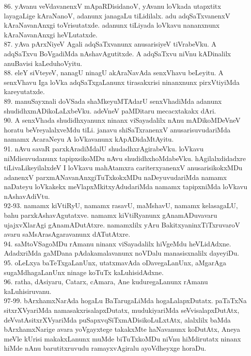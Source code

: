 \documentclass{article}
\begin{document}
86. yAvanu veVdavanenxV mApaRDisidanoV, yAvanu loVkada utapxtitx layagaLige kAraNanoV, adanunx janagaLu tiLidilalx. adu adqSaTxvanenxV kAraNavanAnxgi toVrisutatxde. adanunx tiLiyada loVkavu nananxnunx kAraNavanAnxgi heVLutatxde.\\
87. yAva pArxNiyeV Agali adqSaTxvanunx anusarisiyeV tiVrabeVku. A adqSaTxvu BoVgadiMda nAshavAgutitxde. A adqSaTxvu niVnu kADinalilx anuBavisi kaLeduhoVyitu.\\
88. eleY siVteyeV, nanagU ninagU akAraNavAda senxVhavu beLeyitu. A senxVhavu Iga loVka adqSaTxgaLanunx tirasakxrisi ninanxnunx pirxVtiyiMda kareyutatxde.\\
89. manuSayxnali doVSada shaMkeyuMTAdarU senxVhadiMda adanunx shudidhxmADikoLaLxbeVku. adeVneV paMDitaru mecacxtakakx dAri.\\
90. A senxVhada shudidhxyanunx ninanx viSayadalilx nAnu mADikoMDeVneV horatu beVreyalalxveMdu tiLi. janavu shiSaTxranenxV anusarisuvudariMda namamx AcaraNeyu A loVkavanunx kApADidaMtAyitu.\\
91. nAvu savaR parxkAradiMdalU shudadhxrAgirabeVku. loVkavu niMdisuvudanunx tapipxsikoMDu nAvu shudidhxhoMdabeVku. hAgilalxdidadxre tiLivaLikeyilalxdeV I loVkavu mahAtamxra cariterxyanenxV anusarisikokxMDu adanenxV parxmANavanAnxgiTuTxkokxMDu naDeyuvudariMda namamx naDateyu loVkakekx meVlapxMkitxyAdudariMda namamx tapipxniMda loVkavu nAshavAdiVtu.\\
92-93. namamx kiVtiRyU, namamx rasavU, maMshavU, namamx kelasagaLU, bahu parxkAshavAgutatxve. namamx kiVtiRyanunx gAnamADuvavaru ujajxvXlarAgi gAnamADutAtxre. namamxlilx yAru BakitxyaninxTiTxruvaroV avaru saMsArasAgaravanunx dATutAtxre.\\
94. saMtoVSagoMDu rAmanu ninanx viSayadalilx hiVgeMdu heVLidAdxne. AdadxriMda gaMDana pAdakamalavanunx noVDalu manasisxnalilx dayeyiDu.\\
95. oLeLxya baTeTxgaLanUnx, utatxmavAda oDavegaLanUnx, aMgarAga sugaMdhagaLanUnx ninage koTuTx kaLuhisidAdxne.\\
96. ratha, dAsiyaru, Catarx, cAmara, Ane kuduregaLanunx rAmanu kaLuhisiruvanu.\\
97-99. bArxhamxNarAda hogaLu BaTarugaLiMda hogaLalapxDutatx. paTaTxNa sitxrXVyariMda namasakxrisalapxDutatx, mudukiyariMda seVvisalapxDutAtx, deVvatAsitxrXVyariMda puSapxvqSiTxmADisikoLuLxtAtx,  alalxlilx baMda bArxhamxNarige avara yoVgayxtege takakxMte haNavanunx koDutAtx, Aneya meVle kUrisi makakxLanunx muMde biTuTxkoMDu niVnu hiMdirutatx ninanx hiMde nAnu barutitxruvudu ramayxvAgiralu ayoVdheyxge horaDu.\\
\end{document}
